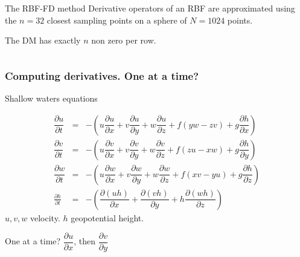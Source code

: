 \documentclass{beamer}
\begin{document}
\begin{frame}[fragile]
\begin{columns}
\begin{block}{The RBF-FD method}
      Derivative operators of an RBF are approximated using the $n=32$
      closest sampling points on a sphere of $N=1024$ points.

      The DM has exactly $n$ non zero per row.
    \end{block}
    
  \end{columns}
\end{frame}


\begin{frame}
  \frametitle{Computing derivatives. One at a time?}
  
  \begin{block}{Shallow waters equations}
    
    \begin{eqnarray}
      \dfrac{\partial u}{\partial t} &=& - \left( u\dfrac{\partial u}{\partial x} + v\dfrac{\partial u}{\partial y} + w\dfrac{\partial u}{\partial z} + f(yw - zv) + g\dfrac{\partial h}{\partial x} \right) 
      \nonumber \\
      \dfrac{\partial v}{\partial t} &=& - \left( u\dfrac{\partial v}{\partial x} + v\dfrac{\partial v}{\partial y} + w\dfrac{\partial v}{\partial z} + f(zu - xw) + g\dfrac{\partial h}{\partial y} \right)
      \nonumber\\
      \dfrac{\partial w}{\partial t} &=& - \left( u\dfrac{\partial w}{\partial x} + v\dfrac{\partial w}{\partial y} + w\dfrac{\partial w}{\partial z} + f(xv - yu) + g\dfrac{\partial h}{\partial z} \right) 
      \nonumber\\
      \frac{\partial h}{\partial t} &=& -\left(\dfrac{\partial (uh)}{\partial x} + \dfrac{\partial (vh)}{\partial y} + h\dfrac{\partial (wh)}{\partial z}\right)  \nonumber
    \end{eqnarray}
    $u,v,w$ velocity. $h$ geopotential height.
  \end{block}
  
  One at a time? $\dfrac{\partial u}{\partial x}$, then $\dfrac{\partial v}{\partial y}$

  

\end{frame}
\end{document}
